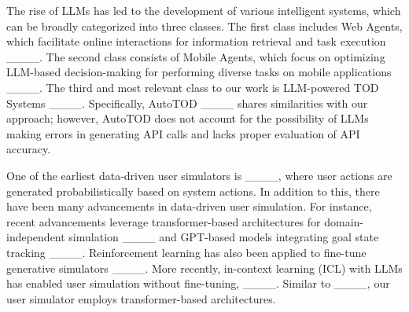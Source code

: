  The rise of LLMs has led to the development of various intelligent systems, which can be broadly categorized into three classes. The first class includes Web Agents, which facilitate online interactions for information retrieval and task execution ____. The second class consists of Mobile Agents, which focus on optimizing LLM-based decision-making for performing diverse tasks on mobile applications ____. The third and most relevant class to our work is LLM-powered TOD Systems ____. Specifically, AutoTOD ____ shares similarities with our approach; however, AutoTOD does not account for the possibility of LLMs making errors in generating API calls and lacks proper evaluation of API accuracy.


One of the earliest data-driven user simulators is ____, where user actions are generated probabilistically based on system actions. In addition to this, there have been many advancements in data-driven user simulation. For instance, recent advancements leverage transformer-based architectures for domain-independent simulation ____ and GPT-based models integrating goal state tracking ____. Reinforcement learning has also been applied to fine-tune generative simulators ____.
More recently, in-context learning (ICL) with LLMs has enabled user simulation without fine-tuning, ____. Similar to ____, our user simulator employs transformer-based architectures.




